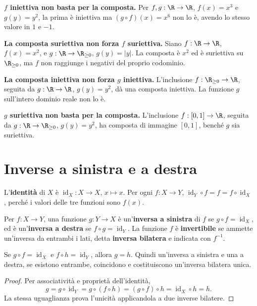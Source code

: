 \begin{esempio}
\textbf{$f$ iniettiva non basta per la composta.} Per $f,g:\R\to\R$, $f(x)=x^3$ e $g(y)=y^2$, la prima è iniettiva ma $(g\circ f)(x)=x^6$ non lo è, avendo lo stesso valore in $1$ e $-1$.

\textbf{La composta suriettiva non forza $f$ suriettiva.} Siano $f:\R\to\R$, $f(x)=x^2$, e $g:\R\to\R_{\ge0}$, $g(y)=|y|$. La composta è $x^2$ ed è suriettiva su $\R_{\ge0}$, ma $f$ non raggiunge i negativi del proprio codominio.

\textbf{La composta iniettiva non forza $g$ iniettiva.} L'inclusione $f:\R_{\ge0}\to\R$, seguita da $g:\R\to\R$, $g(y)=y^2$, dà una composta iniettiva. La funzione $g$ sull'intero dominio reale non lo è.

\textbf{$g$ suriettiva non basta per la composta.} L'inclusione $f:[0,1]\to\R$, seguita da $g:\R\to\R_{\ge0}$, $g(y)=y^2$, ha composta di immagine $[0,1]$, benché $g$ sia suriettiva.
\end{esempio}

\section{Inverse a sinistra e a destra}
L'\textbf{identità} di $X$ è $\operatorname{id}_X:X\to X$, $x\mapsto x$. Per ogni $f:X\to Y$, $\operatorname{id}_Y\circ f=f=f\circ\operatorname{id}_X$, perché i valori delle tre funzioni sono $f(x)$.

\begin{definizione}
Per $f:X\to Y$, una funzione $g:Y\to X$ è un'\textbf{inversa a sinistra} di $f$ se $g\circ f=\operatorname{id}_X$, ed è un'\textbf{inversa a destra} se $f\circ g=\operatorname{id}_Y$. La funzione $f$ è \textbf{invertibile} se ammette un'inversa da entrambi i lati, detta \textbf{inversa bilatera} e indicata con $f^{-1}$.
\end{definizione}

\begin{proposizione}
Se $g\circ f=\operatorname{id}_X$ e $f\circ h=\operatorname{id}_Y$, allora $g=h$. Quindi un'inversa a sinistra e una a destra, se esistono entrambe, coincidono e costituiscono un'inversa bilatera unica.
\end{proposizione}
\begin{proof}
Per associatività e proprietà dell'identità,
\[
g=g\circ\operatorname{id}_Y=g\circ(f\circ h)
=(g\circ f)\circ h=\operatorname{id}_X\circ h=h.
\]
La stessa uguaglianza prova l'unicità applicandola a due inverse bilatere.
\end{proof}

